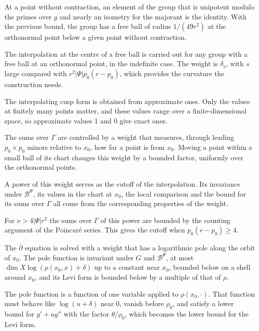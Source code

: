 At a point without contraction, an element of the group that is unipotent modulo the primes over $g$ and
nearly an isometry for the majorant is the identity. With the previous bound, the group has a free ball of
radius $1/(49r^2)$ at the orthonormal point below a given point without contraction.

The interpolation at the centre of a free ball is carried out for any group with a free ball at an
orthonormal point, in the indefinite case. The weight is $\delta_s$, with $s$ large compared with
$r^2|\Psi|p_0(r-p_0)$, which provides the curvature the construction needs.

The interpolating cusp form is obtained from approximate ones. Only the values at finitely many points
matter, and these values range over a finite-dimensional space, so approximate values $1$ and $0$ give
exact ones.

The sums over $\Gamma$ are controlled by a weight that measures, through leading $p_0\times p_0$ minors
relative to $x_0$, how far a point is from $x_0$. Moving a point within a small ball of its chart changes
this weight by a bounded factor, uniformly over the orthonormal points.

A power of this weight serves as the cutoff of the interpolation. Its invariance under $\mathcal B^\Psi$,
its values in the chart at $x_0$, the local comparison and the bound for its sums over $\Gamma$ all come from
the corresponding properties of the weight.

For $\nu>4|\Psi|r^2$ the sums over $\Gamma$ of this power are bounded by the counting argument of the
Poincaré series. This gives the cutoff when $p_0(r-p_0)\geq4$.

The $\bar\partial$ equation is solved with a weight that has a logarithmic pole along the orbit of $x_0$.
The pole function is invariant under $G$ and $\mathcal B^\Psi$, at most $\dim X\log(\rho(x_0,x)+\delta)$ up
to a constant near $x_0$, bounded below on a shell around $x_0$, and its Levi form is bounded below by a
multiple of that of $\rho$.

The pole function is a function of one variable applied to $\rho(x_0,\cdot)$. That function must behave like
$\log(u+\delta)$ near $0$, vanish before $\rho_0$, and satisfy a lower bound for $g'+ug''$ with the factor
$\theta/\rho_0$, which becomes the lower bound for the Levi form.

